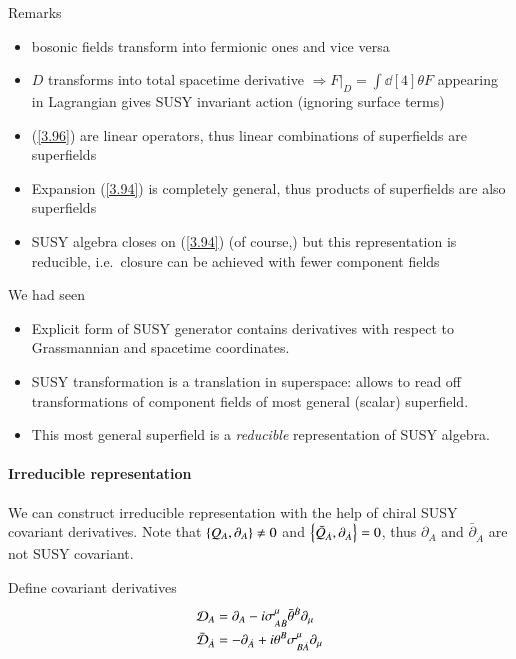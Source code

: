Remarks
\begin{itemize}
   \item bosonic fields transform into fermionic ones and vice versa
   \item $D$ transforms into total spacetime derivative $\Rightarrow F|_D = \int \dd[4]{\theta} F$ appearing in Lagrangian gives SUSY invariant action (ignoring surface terms)
   \item (\ref{3.96}) are linear operators, thus linear combinations of superfields are superfields
   \item Expansion (\ref{3.94}) is completely general, thus products of superfields are also superfields
   \item SUSY algebra closes on (\ref{3.94}) (of course,) but this representation is reducible, i.e.~closure can be achieved with fewer component fields
\end{itemize}

We had seen
\begin{itemize}
   \item Explicit form of SUSY generator contains derivatives with respect to Grassmannian and spacetime coordinates.
   \item SUSY transformation is a translation in superspace: allows to read off transformations of component fields of most general (scalar) superfield.
   \item This most general superfield is a \textit{reducible} representation of SUSY algebra.
\end{itemize}

\paragraph{Irreducible representation}
We can construct irreducible representation with the help of chiral SUSY covariant derivatives.
Note that $\acomm{Q_A}{{\partial}_A} \neq 0$ and $\acomm{\bar{Q}_{\dot{A}}}{\partial_{\dot{A}}} = 0$, thus $\partial_A$ and $\bar\partial_{\dot{A}}$ are not SUSY covariant.

Define covariant derivatives
\begin{subequations}
   \label{3.101}
   \begin{align}
      \mathcal{D}_A &= \partial_A -i \sigma^{\mu}_{A\dot{B}} \bar\theta^{\dot{B}} \partial_\mu \label{3.101a} \\
      \bar{\mathcal{D}}_{\dot{A}} &= - \partial_{\dot{A}} + i \theta^B \sigma^\mu_{B\dot{A}} \partial_\mu \label{3.101b}
   \end{align} 
\end{subequations}


